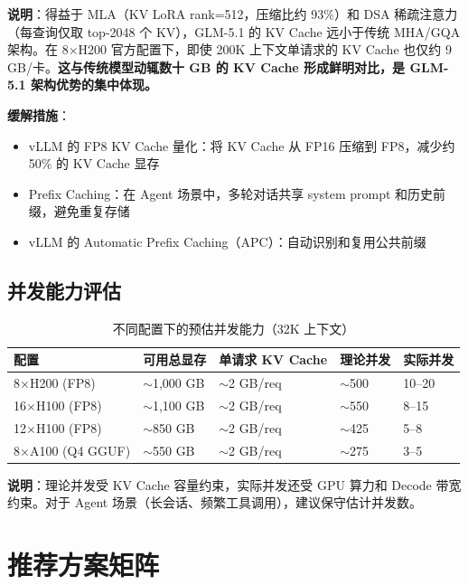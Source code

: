 \documentclass[UTF8,a4paper,10pt,oneside]{ctexart}
\begin{document}
\textbf{说明}：得益于 MLA（KV LoRA rank=512，压缩比约 93\%）和 DSA 稀疏注意力（每查询仅取 top-2048 个 KV），GLM-5.1 的 KV Cache 远小于传统 MHA/GQA 架构。在 8$\times$H200 官方配置下，即使 200K 上下文单请求的 KV Cache 也仅约 9 GB/卡。\textbf{这与传统模型动辄数十 GB 的 KV Cache 形成鲜明对比，是 GLM-5.1 架构优势的集中体现。}

\textbf{缓解措施}：
\begin{itemize}
    \item vLLM 的 FP8 KV Cache 量化：将 KV Cache 从 FP16 压缩到 FP8，减少约 50\% 的 KV Cache 显存
    \item Prefix Caching：在 Agent 场景中，多轮对话共享 system prompt 和历史前缀，避免重复存储
    \item vLLM 的 Automatic Prefix Caching（APC）：自动识别和复用公共前缀
\end{itemize}

\subsection{并发能力评估}

\begin{table}[htbp]
\centering
\caption{不同配置下的预估并发能力（32K 上下文）}
\begin{tabular}{p{3cm}p{2.5cm}p{2.5cm}p{2.5cm}p{2.2cm}}
\hline
\textbf{配置} & \textbf{可用总显存} & \textbf{单请求 KV Cache} & \textbf{理论并发} & \textbf{实际并发} \\
\hline
8$\times$H200 (FP8) & $\sim$1,000 GB & $\sim$2 GB/req & $\sim$500 & 10--20 \\
16$\times$H100 (FP8) & $\sim$1,100 GB & $\sim$2 GB/req & $\sim$550 & 8--15 \\
12$\times$H100 (FP8) & $\sim$850 GB & $\sim$2 GB/req & $\sim$425 & 5--8 \\
8$\times$A100 (Q4 GGUF) & $\sim$550 GB & $\sim$2 GB/req & $\sim$275 & 3--5 \\
\hline
\end{tabular}
\end{table}

\textbf{说明}：理论并发受 KV Cache 容量约束，实际并发还受 GPU 算力和 Decode 带宽约束。对于 Agent 场景（长会话、频繁工具调用），建议保守估计并发数。


\section{推荐方案矩阵}
\end{document}

